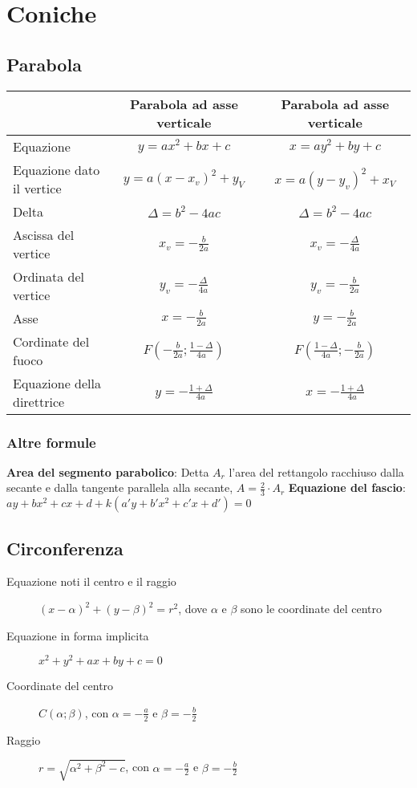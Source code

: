 \documentclass[a4paper,12pt]{article}
\begin{document}
\section{Coniche}
\subsection{Parabola}
  \begin{tabular}{ | l | c | c | }
    \hline & Parabola ad asse verticale & Parabola ad asse verticale \\ \hline
    Equazione & $y=ax^2+bx+c$ & $x=ay^2+by+c$ \\ \hline
    Equazione dato il vertice & $y=a(x-x_v)^2+y_V$ & $x=a(y-y_v)^2+x_V$ \\ \hline
    Delta & $\Delta=b^2-4ac$ & $\Delta=b^2-4ac$ \\ \hline
    Ascissa del vertice & $x_v=-\frac{b}{2a}$ & $x_v=-\frac{\Delta}{4a}$ \\ \hline
    Ordinata del vertice & $y_v=-\frac{\Delta}{4a}$ & $y_v=-\frac{b}{2a}$ \\ \hline
    Asse & $x=-\frac{b}{2a}$ & $y=-\frac{b}{2a}$ \\ \hline
    Cordinate del fuoco & $F(-\frac{b}{2a}; \frac{1-\Delta}{4a})$ & $F(\frac{1-\Delta}{4a};-\frac{b}{2a})$ \\ \hline
    Equazione della direttrice & $y=-\frac{1+\Delta}{4a}$ & $x=-\frac{1+\Delta}{4a}$ \\ \hline
  \end{tabular}
  \subsubsection{Altre formule}
  \textbf{Area del segmento parabolico}: Detta $A_r$ l'area del rettangolo racchiuso dalla secante e dalla tangente parallela alla secante, $A=\frac{2}{3} \cdot A_r$
  \textbf{Equazione del fascio}: $ay+bx^2+cx+d+k(a'y+b'x^2+c'x+d')=0$
\subsection{Circonferenza}
	\begin{description}
	\item[Equazione noti il centro e il raggio] $(x-\alpha)^2+(y-\beta)^2=r^2$, dove $\alpha$ e $\beta$ sono le coordinate del centro
	\item[Equazione in forma implicita] \begin{math}x^2+y^2+ax+by+c=0\end{math}
	\item[Coordinate del centro] $C(\alpha ; \beta)$, con $\alpha = -\frac{a}{2}$ e $\beta = -\frac{b}{2}$
	\item[Raggio]$r=\sqrt{\alpha^2+\beta^2-c}$, con $\alpha = -\frac{a}{2}$ e $\beta = -\frac{b}{2}$
	\end{description}
\end{document}
